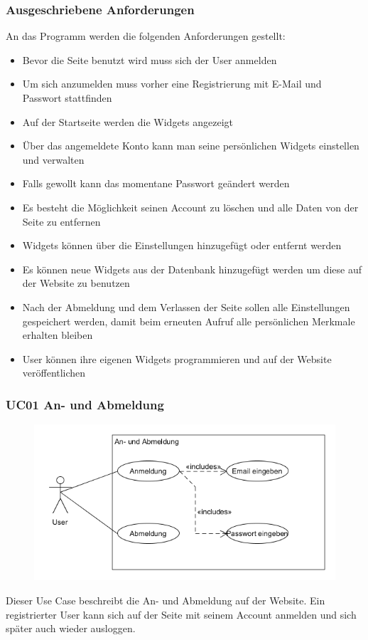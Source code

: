 		\subsubsection{Ausgeschriebene Anforderungen}
			An das Programm werden die folgenden Anforderungen gestellt: 
			\begin{itemize}
				\item Bevor die Seite benutzt wird muss sich der User anmelden 
				\item Um sich anzumelden muss vorher eine Registrierung mit E-Mail und Passwort stattfinden  
				\item Auf der Startseite werden die Widgets angezeigt
				\item Über das angemeldete Konto kann man seine persönlichen Widgets einstellen und verwalten
				\item Falls gewollt kann das momentane Passwort geändert werden
				\item Es besteht die Möglichkeit seinen Account zu löschen und alle Daten von der Seite zu entfernen 
				\item Widgets können über die Einstellungen hinzugefügt oder entfernt werden
				\item Es können neue Widgets aus der Datenbank hinzugefügt werden um diese auf der Website zu benutzen 
				\item Nach der Abmeldung und dem Verlassen der Seite sollen alle Einstellungen gespeichert werden, damit beim erneuten Aufruf alle persönlichen Merkmale erhalten bleiben   
				\item User können ihre eigenen Widgets programmieren und auf der Website veröffentlichen    
			\end{itemize}
		
		\label{usecase}
		\subsubsection{UC01 An- und Abmeldung}
			\begin{figure}[H]
				\includegraphics[scale=0.8]{images/AnAbmeldung}
			\end{figure}
			Dieser Use Case beschreibt die An- und Abmeldung auf der Website. Ein registrierter User kann sich auf der Seite mit seinem Account anmelden und sich später auch wieder ausloggen. 
		
